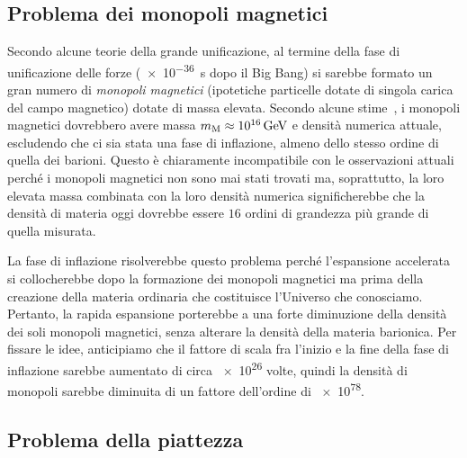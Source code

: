\subsection{Problema dei monopoli magnetici}
\label{sec:problema-monopoli}

Secondo alcune teorie della grande unificazione, al termine della fase di
unificazione delle forze (\SI{e-36}{\second} dopo il Big Bang) si sarebbe
formato un gran numero di \emph{monopoli magnetici} (ipotetiche particelle
dotate di singola carica del campo magnetico) dotate di massa elevata.  Secondo
alcune stime~\parencite[143-145]{2002coec.book.....C}, i monopoli magnetici
dovrebbero avere massa \(m_{\textup{M}} \approx \SI{e16}{\giga\electronvolt}\) e
densità numerica attuale, escludendo che ci sia stata una fase di inflazione,
almeno dello stesso ordine di quella dei barioni.  Questo è chiaramente
incompatibile con le osservazioni attuali perché i monopoli magnetici non sono
mai stati trovati ma, soprattutto, la loro elevata massa combinata con la loro
densità numerica significherebbe che la densità di materia oggi dovrebbe essere
\(16\) ordini di grandezza più grande di quella misurata.

La fase di inflazione risolverebbe questo problema perché l'espansione
accelerata si collocherebbe dopo la formazione dei monopoli magnetici ma prima
della creazione della materia ordinaria che costituisce l'Universo che
conosciamo.  Pertanto, la rapida espansione porterebbe a una forte diminuzione
della densità dei soli monopoli magnetici, senza alterare la densità della
materia barionica.  Per fissare le idee, anticipiamo che il fattore di scala fra
l'inizio e la fine della fase di inflazione sarebbe aumentato di circa \num{e26}
volte, quindi la densità di monopoli sarebbe diminuita di un fattore dell'ordine
di \num{e78}.

\subsection{Problema della piattezza}
\label{sec:problema-piattezza}

